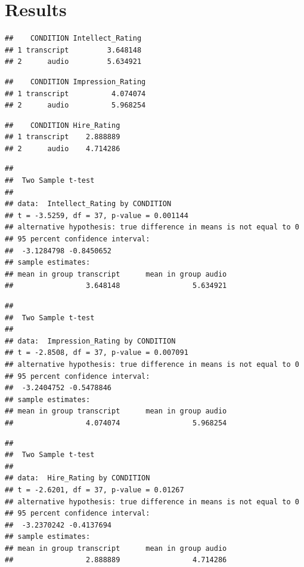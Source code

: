 \documentclass[
  english,
  man]{apa6}
\begin{document}
\hypertarget{results}{%
\section{Results}\label{results}}

\begin{verbatim}
##    CONDITION Intellect_Rating
## 1 transcript         3.648148
## 2      audio         5.634921
\end{verbatim}

\begin{verbatim}
##    CONDITION Impression_Rating
## 1 transcript          4.074074
## 2      audio          5.968254
\end{verbatim}

\begin{verbatim}
##    CONDITION Hire_Rating
## 1 transcript    2.888889
## 2      audio    4.714286
\end{verbatim}

\begin{verbatim}
## 
##  Two Sample t-test
## 
## data:  Intellect_Rating by CONDITION
## t = -3.5259, df = 37, p-value = 0.001144
## alternative hypothesis: true difference in means is not equal to 0
## 95 percent confidence interval:
##  -3.1284798 -0.8450652
## sample estimates:
## mean in group transcript      mean in group audio 
##                 3.648148                 5.634921
\end{verbatim}

\begin{verbatim}
## 
##  Two Sample t-test
## 
## data:  Impression_Rating by CONDITION
## t = -2.8508, df = 37, p-value = 0.007091
## alternative hypothesis: true difference in means is not equal to 0
## 95 percent confidence interval:
##  -3.2404752 -0.5478846
## sample estimates:
## mean in group transcript      mean in group audio 
##                 4.074074                 5.968254
\end{verbatim}

\begin{verbatim}
## 
##  Two Sample t-test
## 
## data:  Hire_Rating by CONDITION
## t = -2.6201, df = 37, p-value = 0.01267
## alternative hypothesis: true difference in means is not equal to 0
## 95 percent confidence interval:
##  -3.2370242 -0.4137694
## sample estimates:
## mean in group transcript      mean in group audio 
##                 2.888889                 4.714286
\end{verbatim}
\end{document}
